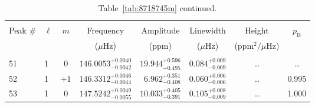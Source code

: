 \begin{table*}[!]
\caption{Table~\ref{tab:8718745m} continued.}
\label{tab:8718745m2}
\centering
\begin{tabular}{llcrrlrc}
\hline\hline
\\[-8pt]          
Peak \# & $\ell$ & $m$ & \multicolumn{1}{c}{Frequency} & \multicolumn{1}{c}{Amplitude} & \multicolumn{1}{c}{Linewidth} & \multicolumn{1}{c}{Height}& $p_\mathrm{B}$\\
 & & & \multicolumn{1}{c}{($\mu$Hz)} & \multicolumn{1}{c}{(ppm)} & \multicolumn{1}{c}{($\mu$Hz)} & \multicolumn{1}{c}{(ppm$^2/\mu$Hz)}\\
\hline \\[-8pt]

51 & 1 & 0 & $    146.0053_{-      0.0042}^{+      0.0040}$ & $      19.944_{-       0.495}^{+       0.596}$ & $       0.084_{-       0.009}^{+       0.009}$ & \multicolumn{1}{c}{\dots} & \dots \\[1pt]
52 & 1 & $+1$ & $    146.3312_{-      0.0044}^{+      0.0046}$ & $       6.962_{-       0.408}^{+       0.351}$ & $       0.060_{-       0.006}^{+       0.006}$ & \multicolumn{1}{c}{\dots} & 0.995 \\[1pt]
53 & 1 & 0 & $    147.5242_{-      0.0055}^{+      0.0049}$ & $      10.033_{-       0.391}^{+       0.405}$ & $       0.105_{-       0.009}^{+       0.008}$ & \multicolumn{1}{c}{\dots} & 1.000 \\[1pt]


\end{tabular}
\end{table*}
